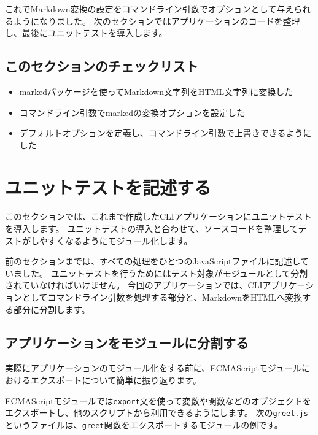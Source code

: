これでMarkdown変換の設定をコマンドライン引数でオプションとして与えられるようになりました。
次のセクションではアプリケーションのコードを整理し、最後にユニットテストを導入します。

\hypertarget{section-checklist}{%
\subsection{このセクションのチェックリスト}\label{section-checklist}}

\begin{itemize}
\item
  markedパッケージを使ってMarkdown文字列をHTML文字列に変換した
\item
  コマンドライン引数でmarkedの変換オプションを設定した
\item
  デフォルトオプションを定義し、コマンドライン引数で上書きできるようにした
\end{itemize}

\hypertarget{unit-test}{%
\section{ユニットテストを記述する}\label{unit-test}}

このセクションでは、これまで作成したCLIアプリケーションにユニットテストを導入します。
ユニットテストの導入と合わせて、ソースコードを整理してテストがしやすくなるようにモジュール化します。

前のセクションまでは、すべての処理をひとつのJavaScriptファイルに記述していました。
ユニットテストを行うためにはテスト対象がモジュールとして分割されていなければいけません。
今回のアプリケーションでは、CLIアプリケーションとしてコマンドライン引数を処理する部分と、MarkdownをHTMLへ変換する部分に分割します。

\hypertarget{split-script}{%
\subsection{アプリケーションをモジュールに分割する}\label{split-script}}

実際にアプリケーションのモジュール化をする前に、\hyperlink{module}{ECMAScriptモジュール}におけるエクスポートについて簡単に振り返ります。

ECMAScriptモジュールでは\texttt{export}文を使って変数や関数などのオブジェクトをエクスポートし、他のスクリプトから利用できるようにします。
次の\texttt{greet.js}というファイルは、\texttt{greet}関数をエクスポートするモジュールの例です。

